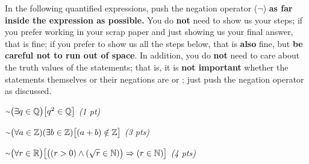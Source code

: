 \documentclass[letterpaper,10pt]{article}
\begin{document}
{\large In the following quantified expressions, push the negation operator ($\neg$) {\bf as far inside the expression as possible.} You do {\bf not} need to show us your steps; if you prefer working in your scrap paper and just showing us your final answer, that is fine; if you prefer to show us all the steps below, that is {\bf also} fine, but \textbf{be careful not to run out of space}. In addition, you do {\bf not} need to care about the truth values of the statements; that is, it is \textbf{not important} whether the statements themselves or their negations are \True{} or \False{}; just push the negation operator as discussed. 

\begin{enumerate}[label=(\roman*)]  
{\Large 
  \setlength\itemsep{.3em}	\item $\neg \big (\exists q \in \Q \big ) \big [ q^{2} \in \Q \big ]$  {\em (1 pt)}
	\item $\neg \big (\forall a \in \Z ) (\exists b \in \Z) \big [ (a + b) \notin \Z \big ]$  {\em (3 pts)}
	\item $\neg \big (\forall r \in \R \big ) \big [ \big ( (r > 0) \land ( \sqrt{r} \in \N)\big ) \Rightarrow (r \in \N) \big ]$  {\em (4 pts)} }
\end{enumerate}
} \vspace{-.4in}

\end{document}

